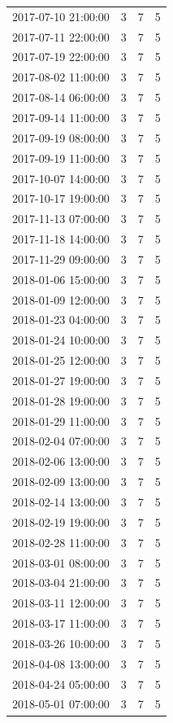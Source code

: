 \begin{tabular}{lrrr}
2017-07-10 21:00:00 & 3 & 7 & 5 \\
2017-07-11 22:00:00 & 3 & 7 & 5 \\
2017-07-19 22:00:00 & 3 & 7 & 5 \\
2017-08-02 11:00:00 & 3 & 7 & 5 \\
2017-08-14 06:00:00 & 3 & 7 & 5 \\
2017-09-14 11:00:00 & 3 & 7 & 5 \\
2017-09-19 08:00:00 & 3 & 7 & 5 \\
2017-09-19 11:00:00 & 3 & 7 & 5 \\
2017-10-07 14:00:00 & 3 & 7 & 5 \\
2017-10-17 19:00:00 & 3 & 7 & 5 \\
2017-11-13 07:00:00 & 3 & 7 & 5 \\
2017-11-18 14:00:00 & 3 & 7 & 5 \\
2017-11-29 09:00:00 & 3 & 7 & 5 \\
2018-01-06 15:00:00 & 3 & 7 & 5 \\
2018-01-09 12:00:00 & 3 & 7 & 5 \\
2018-01-23 04:00:00 & 3 & 7 & 5 \\
2018-01-24 10:00:00 & 3 & 7 & 5 \\
2018-01-25 12:00:00 & 3 & 7 & 5 \\
2018-01-27 19:00:00 & 3 & 7 & 5 \\
2018-01-28 19:00:00 & 3 & 7 & 5 \\
2018-01-29 11:00:00 & 3 & 7 & 5 \\
2018-02-04 07:00:00 & 3 & 7 & 5 \\
2018-02-06 13:00:00 & 3 & 7 & 5 \\
2018-02-09 13:00:00 & 3 & 7 & 5 \\
2018-02-14 13:00:00 & 3 & 7 & 5 \\
2018-02-19 19:00:00 & 3 & 7 & 5 \\
2018-02-28 11:00:00 & 3 & 7 & 5 \\
2018-03-01 08:00:00 & 3 & 7 & 5 \\
2018-03-04 21:00:00 & 3 & 7 & 5 \\
2018-03-11 12:00:00 & 3 & 7 & 5 \\
2018-03-17 11:00:00 & 3 & 7 & 5 \\
2018-03-26 10:00:00 & 3 & 7 & 5 \\
2018-04-08 13:00:00 & 3 & 7 & 5 \\
2018-04-24 05:00:00 & 3 & 7 & 5 \\
2018-05-01 07:00:00 & 3 & 7 & 5 \\

\end{tabular}
